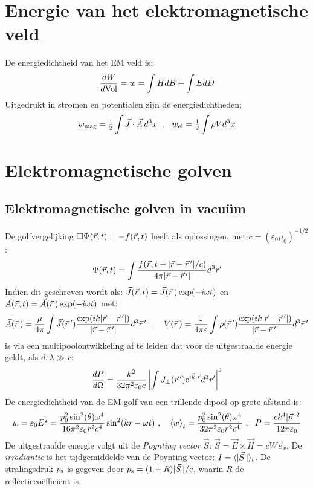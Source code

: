 \section{Energie van het elektromagnetische veld}
De energiedichtheid van het EM veld is:
\[
\frac{dW}{d{\rm Vol}}=w=\int HdB+\int EdD
\]
Uitgedrukt in stromen en potentialen zijn de energiedichtheden;
\[
w_{\rm mag}=\mbox{$\frac{1}{2}$}\int\vec{J}\cdot\vec{A}\,d^3x~~,~~w_{\rm el}=\mbox{$\frac{1}{2}$}\int\rho Vd^3x
\]

\section{Elektromagnetische golven}
\subsection{Elektromagnetische golven in vacu\"um}
De golfvergelijking $\Box\Psi(\vec{r},t)=-f(\vec{r},t)$ heeft als oplossingen, met
$c=(\varepsilon_0\mu_0)^{-1/2}$:
\[
\Psi(\vec{r},t)=\int\frac{f(\vec{r},t-|\vec{r}-\vec{r}\,'|/c)}{4\pi|\vec{r}-\vec{r}\,'|}d^3r'
\]
Indien dit geschreven wordt als: $\vec{J}(\vec{r},t)=\vec{J}(\vec{r}\,)\exp(-i\omega t)$ en
$\vec{A}(\vec{r},t)=\vec{A}(\vec{r}\,)\exp(-i\omega t)$ met:
\[
\vec{A}(\vec{r}\,)=\frac{\mu}{4\pi}\int\vec{J}(\vec{r}\,')\frac{\exp(ik|\vec{r}-\vec{r}\,'|)}{|\vec{r}-\vec{r}\,'|}d^3\vec{r}\,'~~,~~~
V(\vec{r}\,)=\frac{1}{4\pi\varepsilon}\int\rho(\vec{r}\,')\frac{\exp(ik|\vec{r}-\vec{r}\,'|)}{|\vec{r}-\vec{r}\,'|}d^3\vec{r}\,'
\]
is via een multipoolontwikkeling af te leiden dat voor de uitgestraalde
energie geldt, als $d,\lambda\gg r$:
\[
\frac{dP}{d\Omega}=\frac{k^2}{32\pi^2\varepsilon_0c}\left|\int J_\perp(\vec{r}\,'){\rm e}^{i\vec{k}\cdot\vec{r}}d^3r'\right|^2
\]
De energiedichtheid van de EM golf van een trillende dipool op grote afstand
is:
\[
w=\varepsilon_0E^2=\frac{p^2_0\sin^2(\theta)\omega^4}{16\pi^2\varepsilon_0r^2c^4}\sin^2(kr-\omega t)~,~~~
\left\langle w \right\rangle_t=\frac{p^2_0\sin^2(\theta)\omega^4}{32\pi^2\varepsilon_0r^2c^4}~,~~
P=\frac{ck^4|\vec{p}\,|^2}{12\pi\varepsilon_0}
\]
De uitgestraalde energie volgt uit de {\it Poynting vector} $\vec{S}$:
$\vec{S}=\vec{E}\times\vec{H}=cW\vec{e}_v$. De {\it irradiantie} is het
tijdgemiddelde van de Poynting vector: $I=\langle|\vec{S}\,|\rangle_t$. De
stralingsdruk $p_{\rm s}$ is gegeven door $p_{\rm s}=(1+R)|\vec{S}\,|/c$,
waarin $R$ de reflectieco\"effici\"ent is.

